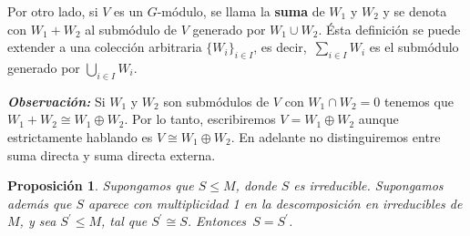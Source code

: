\documentclass[12pt]{book}
\newtheorem{proposition}[theorem]{Proposición}
\theoremstyle{definition}
\newcounter{in}
\newcounter{ini}
\begin{document}
Por otro lado, si $V$ es un $G$-módulo, se llama la \textbf{suma} de $W_{1}$ y $W_{2}$ y se denota con
$W_{1}+W_{2}$ al submódulo de $V$ generado por $W_{1}\cup W_{2}$. Ésta definición se puede extender a una
colección arbitraria $\{W_{i}\}_{i\in I}$, es
decir,~$\sum_{i\in I}W_{i}$ es el submódulo generado por $\bigcup_{i\in I}W_{i}$.

\textbf{\emph{Observación:}} Si $W_{1}$ y $W_{2}$ son
submódulos de $V$ con $W_{1}\cap W_{2}=0$ tenemos que
$W_{1}+W_{2}\cong W_{1}\oplus W_{2}$.  Por lo tanto, escribiremos $V=W_{1}\oplus W_{2}$
aunque estrictamente hablando es $V\cong W_{1}\oplus W_{2}$. En adelante no distinguiremos
entre suma directa y suma directa externa.

\begin{proposition}
  \label{modulos-iguales}
  Supongamos que $S\leq M$, donde $S$ es irreducible. Supongamos
  además que $S$ aparece con multiplicidad 1 en la descomposición en
  irreducibles de $M$, y sea $S^{'}\leq M$, tal que $S^{'}\cong S$. Entonces~$S=S^{'}$.
\end{proposition}
\end{document}
